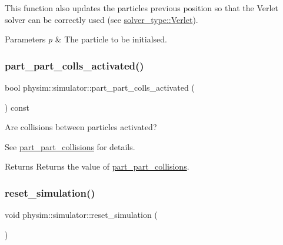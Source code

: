 This function also updates the particle\textquotesingle{}s previous position so that the Verlet solver can be correctly used (see \hyperlink{namespacephysim_a09adeda29c09e651877e880d31fc9686ac1f9df543f33d8a79fb2437c853f09b9}{solver\+\_\+type\+::\+Verlet}). 
\begin{DoxyParams}{Parameters}
{\em p} & The particle to be initialsed. \\
\hline
\end{DoxyParams}
\mbox{\label{classphysim_1_1simulator_ab36133b4fa2b4fb2d8f297f6a7dda497}} 
\subsubsection{\texorpdfstring{part\+\_\+part\+\_\+colls\+\_\+activated()}{part\_part\_colls\_activated()}}
{\footnotesize\ttfamily bool physim\+::simulator\+::part\+\_\+part\+\_\+colls\+\_\+activated (\begin{DoxyParamCaption}{ }\end{DoxyParamCaption}) const}



Are collisions between particles activated? 

See \hyperlink{classphysim_1_1simulator_a4a7d02feac1ca57bb143b70ad8b81134}{part\+\_\+part\+\_\+collisions} for details. \begin{DoxyReturn}{Returns}
Returns the value of \hyperlink{classphysim_1_1simulator_a4a7d02feac1ca57bb143b70ad8b81134}{part\+\_\+part\+\_\+collisions}. 
\end{DoxyReturn}
\mbox{\label{classphysim_1_1simulator_a6d3a5491771496c3da2be7c3382f061b}} 
\subsubsection{\texorpdfstring{reset\+\_\+simulation()}{reset\_simulation()}}
{\footnotesize\ttfamily void physim\+::simulator\+::reset\+\_\+simulation (\begin{DoxyParamCaption}{ }\end{DoxyParamCaption})}



